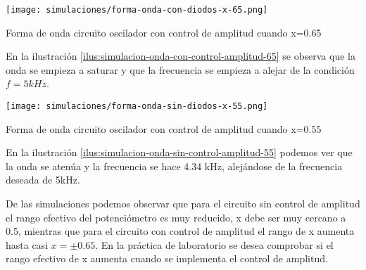 \begin{ilustracion}[ht]
    \centering
    \texttt{[image: simulaciones/forma-onda-con-diodos-x-65.png]}
    \caption{Forma de onda circuito oscilador con control de amplitud cuando x=0.65}
    \label{ilus:simulacion-onda-con-control-amplitud-65}
\end{ilustracion}

En la ilustración \ref{ilus:simulacion-onda-con-control-amplitud-65} se observa que la onda se empieza a saturar y que la frecuencia se empieza a alejar de la condición $f=5kHz$.

\begin{ilustracion}[ht]
    \centering
    \texttt{[image: simulaciones/forma-onda-sin-diodos-x-55.png]}
    \caption{Forma de onda circuito oscilador con control de amplitud cuando x=0.55}
    \label{ilus:simulacion-onda-sin-control-amplitud-55}
\end{ilustracion}

En la ilustración \ref{ilus:simulacion-onda-sin-control-amplitud-55} podemos ver que la onda se atenúa y la frecuencia se hace 4.34 kHz, alejándose de la frecuencia deseada de 5kHz.

De las simulaciones podemos observar que para el circuito sin control de amplitud el rango efectivo del potenciómetro es muy reducido, x debe ser muy cercano a 0.5, mientras que para el circuito con control de amplitud el rango de x aumenta hasta casi $x = \pm 0.65$. En la práctica de laboratorio se desea comprobar si el rango efectivo de x aumenta cuando se implementa el control de amplitud.